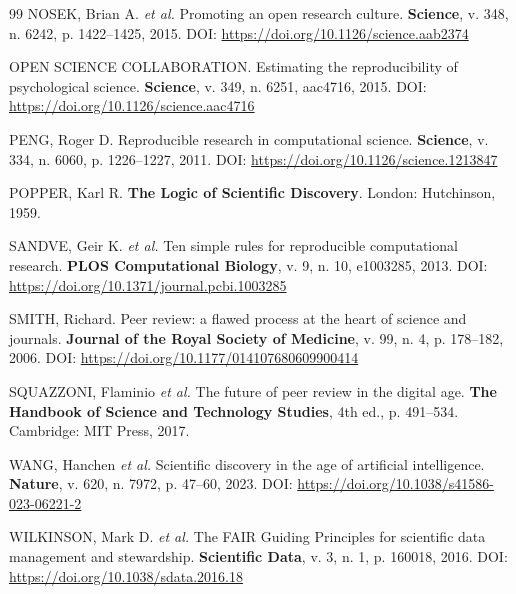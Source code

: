 \begin{thebibliography}{99}
NOSEK, Brian A. \textit{et al.}
Promoting an open research culture.
\textbf{Science}, v. 348, n. 6242, p. 1422--1425, 2015.
DOI: \url{https://doi.org/10.1126/science.aab2374}

OPEN SCIENCE COLLABORATION.
Estimating the reproducibility of psychological science.
\textbf{Science}, v. 349, n. 6251, aac4716, 2015.
DOI: \url{https://doi.org/10.1126/science.aac4716}

PENG, Roger D.
Reproducible research in computational science.
\textbf{Science}, v. 334, n. 6060, p. 1226--1227, 2011.
DOI: \url{https://doi.org/10.1126/science.1213847}

POPPER, Karl R.
\textbf{The Logic of Scientific Discovery}.
London: Hutchinson, 1959.

SANDVE, Geir K. \textit{et al.}
Ten simple rules for reproducible computational research.
\textbf{PLOS Computational Biology}, v. 9, n. 10, e1003285, 2013.
DOI: \url{https://doi.org/10.1371/journal.pcbi.1003285}

SMITH, Richard.
Peer review: a flawed process at the heart of science and journals.
\textbf{Journal of the Royal Society of Medicine}, v. 99, n. 4,
p. 178--182, 2006.
DOI: \url{https://doi.org/10.1177/014107680609900414}

SQUAZZONI, Flaminio \textit{et al.}
The future of peer review in the digital age.
\textbf{The Handbook of Science and Technology Studies},
4th ed., p. 491--534. Cambridge: MIT Press, 2017.

WANG, Hanchen \textit{et al.}
Scientific discovery in the age of artificial intelligence.
\textbf{Nature}, v. 620, n. 7972, p. 47--60, 2023.
DOI: \url{https://doi.org/10.1038/s41586-023-06221-2}

WILKINSON, Mark D. \textit{et al.}
The FAIR Guiding Principles for scientific data management and
stewardship.
\textbf{Scientific Data}, v. 3, n. 1, p. 160018, 2016.
DOI: \url{https://doi.org/10.1038/sdata.2016.18}

\end{thebibliography}


